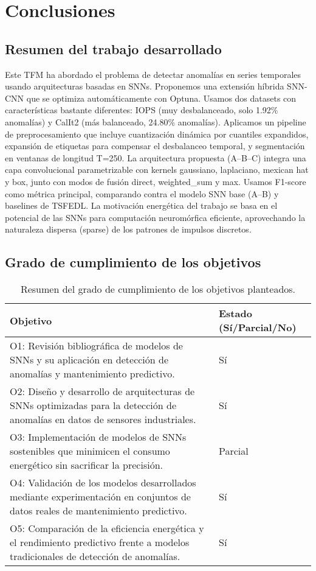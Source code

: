 \chapter{Conclusiones}

\section{Resumen del trabajo desarrollado}
Este TFM ha abordado el problema de detectar anomalías en series temporales usando arquitecturas basadas en SNNs. Proponemos una extensión híbrida SNN-CNN que se optimiza automáticamente con Optuna. Usamos dos datasets con características bastante diferentes: IOPS (muy desbalanceado, solo 1.92\% anomalías) y CalIt2 (más balanceado, 24.80\% anomalías). Aplicamos un pipeline de preprocesamiento que incluye cuantización dinámica por cuantiles expandidos, expansión de etiquetas para compensar el desbalanceo temporal, y segmentación en ventanas de longitud T=250. La arquitectura propuesta (A--B--C) integra una capa convolucional parametrizable con kernels gaussiano, laplaciano, mexican hat y box, junto con modos de fusión direct, weighted\_sum y max. Usamos F1-score como métrica principal, comparando contra el modelo SNN base (A--B) y baselines de TSFEDL. La motivación energética del trabajo se basa en el potencial de las SNNs para computación neuromórfica eficiente, aprovechando la naturaleza dispersa (sparse) de los patrones de impulsos discretos.

\section{Grado de cumplimiento de los objetivos}
\begin{table}[htbp]
    \centering
    \small
    \begin{tabular}{p{}p{}}
        \hline\hline
        \textbf{Objetivo} & \textbf{Estado (Sí/Parcial/No)} \\
        \hline
        O1: Revisión bibliográfica de modelos de SNNs y su aplicación en detección de anomalías y mantenimiento predictivo. & Sí \\
        O2: Diseño y desarrollo de arquitecturas de SNNs optimizadas para la detección de anomalías en datos de sensores industriales. & Sí \\
        O3: Implementación de modelos de SNNs sostenibles que minimicen el consumo energético sin sacrificar la precisión. & Parcial \\
        O4: Validación de los modelos desarrollados mediante experimentación en conjuntos de datos reales de mantenimiento predictivo. & Sí \\
        O5: Comparación de la eficiencia energética y el rendimiento predictivo frente a modelos tradicionales de detección de anomalías. & Sí \\ 
        \hline\hline
    \end{tabular}
    \caption{Resumen del grado de cumplimiento de los objetivos planteados.}
    \label{tab:objetivos-cumplimiento}
\end{table}


